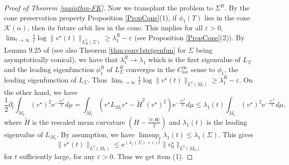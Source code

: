\documentclass[12pt]{amsart}
\numberwithin{equation}{section}
\numberwithin{equation}{section}
\newcommand{\eps}{\varepsilon}
\newcommand{\al}{\alpha}
\newcommand{\bn}{\mathbf{n}}
\DeclareMathOperator{\loc}{loc}
\begin{document}
\begin{proof}[Proof of Theorem \ref{mainthm-FK}]
		Now we transplant the problem to $\Sigma^R$. By the cone preservation property Proposition \ref{PropCone}(1), if $\phi_1(T)$ lies in the cone $\mathcal K(\al)$, then its future orbit lies in the cone. This implies for all $\eps>0$, $\lim_{t\to\infty} \frac{1}{t}\log\|v^\star(t)\|_{L^2_R(\Sigma)}\geq \lambda^R_1-\eps$ (see Proposition \ref{PropCone}(2)).  By Lemma 9.25 of \cite{CM1} (see also Theorem \ref{thm:conv1steigenfun} for $\Sigma$ being asymptotically conical), we have that $\lambda_1^R\to \lambda_1$ which is the first eigenvalue of $L_\Sigma$ and the leading eigenfunction $\phi^R_1$ of $L_\Sigma^R$ converges in the $C^\infty_{\loc}$ sense to $\phi_1$, the leading eigenfunction of $L_\Sigma$. Thus $\lim_{t\to\infty} \frac{1}{t}\log\|v^\star(t)\|_{L^2(M_t)}\geq \lambda^R_1-\eps$. On the other hand, we have
		$$\frac12\partial_t\int_{M_t} (v^\star)^2 \mathrm{e}^{-\frac{|x|^2}{4}}d\mu=\int_{M_t} \left( v^\star L_{M_t}v^\star -\widetilde H^2 (v^\star)^2\right)\mathrm{e}^{-\frac{|x|^2}{4}}d\mu\leq \lambda_1(t)\int_{M_t} (v^\star)^2 \mathrm{e}^{-\frac{|x|^2}{4}}d\mu,$$
		where $\widetilde H$ is the rescaled mean curvature $\left(H-\frac{\langle x,\bn\rangle}{2}\right)$ and $\lambda_1(t)$ is the leading eigenvalue of $L_{M_t}$. By assumption, we have $\limsup_t\lambda_1(t)\leq\lambda_1(\Sigma)$. This gives $$\|v^\star(t)\|_{L^2(M_t)}\leq \mathrm{e}^{(\lambda_1(\Sigma)+\eps)t}\|v^\star_0\|_{L^2(M_0)}$$ for $t$ sufficiently large, for any $\eps>0$. Thus we get item (1). 
		

\end{proof}
\end{document}
